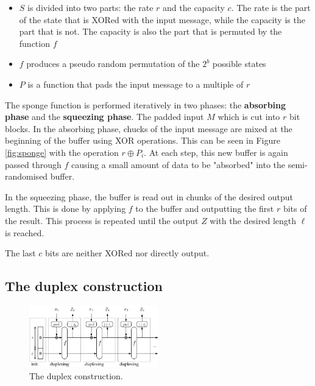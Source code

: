 \documentclass{article}
\begin{document}
\begin{itemize}
  \item $S$ is divided into two parts: the rate $r$ and the capacity $c$. The rate is the part of the state that is XORed with the input message, while the capacity is the part that is not. The capacity is also the part that is permuted by the function $f$
  \item $f$ produces a pseudo random permutation of the $2^b$ possible states
  \item $P$ is a function that pads the input message to a multiple of $r$
\end{itemize}

The sponge function is performed iteratively in two phases: the \textbf{absorbing phase} and the \textbf{squeezing phase}. The padded input $M$ which is cut into $r$ bit blocks. In the absorbing phase, chucks of the input message are mixed at the beginning of the buffer using XOR operations. This can be seen in Figure \ref{fig:sponge} with the operation $r \oplus P_i$. At each step, this new buffer is again passed through $f$ causing a small amount of data to be "absorbed" into the semi-randomised buffer. \cite{keccak_team, sponge_function_2023,DBLP:journals/joc/DobraunigEMS21} \par 

In the squeezing phase, the buffer is read out in chunks of the desired output length. This is done by applying $f$ to the buffer and outputting the first $r$ bits of the result. This process is repeated until the output $Z$ with the desired length $\ell$ is reached. \cite{keccak_team,sponge_function_2023,DBLP:journals/joc/DobraunigEMS21} \par 

The last $c$ bits are neither XORed nor directly output. \par 

\subsection{The duplex construction}

\begin{figure}[htbp]
  \centering
  \includegraphics[width=0.5\textwidth]{images/Duplex-150.png}
  \caption{The duplex construction.}
  \label{fig:duplex}
\end{figure}
\end{document}
